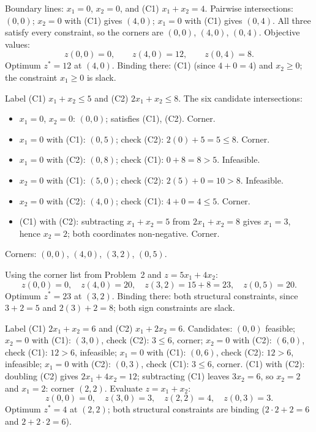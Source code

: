 \begin{solutions}
  \item Boundary lines: $x_{1}=0$, $x_{2}=0$, and (C1) $x_{1}+x_{2}=4$.
        Pairwise intersections: $(0,0)$; $x_{2}=0$ with (C1) gives
        $(4,0)$; $x_{1}=0$ with (C1) gives $(0,4)$. All three satisfy
        every constraint, so the corners are $(0,0)$, $(4,0)$, $(0,4)$.
        Objective values:
        \[
          z(0,0)=0,\qquad z(4,0)=12,\qquad z(0,4)=8 .
        \]
        Optimum $z^{*}=12$ at $(4,0)$. Binding there: (C1) (since
        $4+0=4$) and $x_{2}\ge 0$; the constraint $x_{1}\ge 0$ is slack.

  \item Label (C1) $x_{1}+x_{2}\le 5$ and (C2) $2x_{1}+x_{2}\le 8$. The
        six candidate intersections:
        \begin{itemize}[leftmargin=1.6em,itemsep=0.3ex]
          \item $x_{1}=0$, $x_{2}=0$: $(0,0)$; satisfies (C1), (C2).
                Corner.
          \item $x_{1}=0$ with (C1): $(0,5)$; check (C2):
                $2(0)+5=5\le 8$. Corner.
          \item $x_{1}=0$ with (C2): $(0,8)$; check (C1): $0+8=8>5$.
                Infeasible.
          \item $x_{2}=0$ with (C1): $(5,0)$; check (C2):
                $2(5)+0=10>8$. Infeasible.
          \item $x_{2}=0$ with (C2): $(4,0)$; check (C1): $4+0=4\le 5$.
                Corner.
          \item (C1) with (C2): subtracting $x_{1}+x_{2}=5$ from
                $2x_{1}+x_{2}=8$ gives $x_{1}=3$, hence $x_{2}=2$; both
                coordinates non-negative. Corner.
        \end{itemize}
        Corners: $(0,0)$, $(4,0)$, $(3,2)$, $(0,5)$.

  \item Using the corner list from Problem~2 and $z=5x_{1}+4x_{2}$:
        \[
          z(0,0)=0,\quad z(4,0)=20,\quad z(3,2)=15+8=23,\quad
          z(0,5)=20 .
        \]
        Optimum $z^{*}=23$ at $(3,2)$. Binding there: both structural
        constraints, since $3+2=5$ and $2(3)+2=8$; both sign constraints
        are slack.

  \item Label (C1) $2x_{1}+x_{2}=6$ and (C2) $x_{1}+2x_{2}=6$.
        Candidates: $(0,0)$ feasible; $x_{2}=0$ with (C1): $(3,0)$,
        check (C2): $3\le 6$, corner; $x_{2}=0$ with (C2): $(6,0)$,
        check (C1): $12>6$, infeasible; $x_{1}=0$ with (C1): $(0,6)$,
        check (C2): $12>6$, infeasible; $x_{1}=0$ with (C2): $(0,3)$,
        check (C1): $3\le 6$, corner. (C1) with (C2): doubling (C2)
        gives $2x_{1}+4x_{2}=12$; subtracting (C1) leaves $3x_{2}=6$, so
        $x_{2}=2$ and $x_{1}=2$: corner $(2,2)$. Evaluate
        $z=x_{1}+x_{2}$:
        \[
          z(0,0)=0,\quad z(3,0)=3,\quad z(2,2)=4,\quad z(0,3)=3 .
        \]
        Optimum $z^{*}=4$ at $(2,2)$; both structural constraints are
        binding ($2\cdot 2+2=6$ and $2+2\cdot 2=6$).


\end{solutions}
